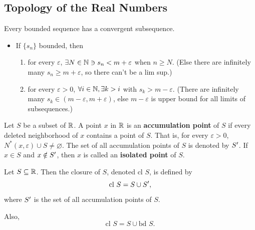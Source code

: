 \documentclass[12pt]{article}
\begin{document}
\subsection{Topology of the Real Numbers}
\label{sec:org67b264d}
Every bounded sequence has a convergent subsequence.
\begin{itemize}
\item If \(\{s_n\}\) bounded, then
\begin{enumerate}
\item for every \(\varepsilon\), \(\exists N \in \mathbb{N} \ni s_n < m + \varepsilon\) when \(n \ge N\). (Else there
are infinitely  many \(s_n \ge  m + \varepsilon\), so  there can't be  a lim
sup.)
\item for every \(\varepsilon > 0\), \(\forall i \in \mathbb{N}, \exists k>i\) with \(s_k > m - \varepsilon\).
(There are infinitely many  \(s_k \in (m-\varepsilon, m+\varepsilon)\), else
\(m-\varepsilon\) is upper bound for all limits of subsequences.)
\end{enumerate}
\end{itemize}

\begin{definition}
  Let $S$ be a subset of $\mathbb{R}$. A point $x$ in $\mathbb{R}$ is an
  \textbf{accumulation point} of $S$ if every deleted neighborhood of $x$
  contains a point of $S$. That is, for every $\varepsilon > 0$, $N^{*}(x,\varepsilon) \cup S \ne
  \varnothing$. The set of all accumulation points of $S$ is denoted by
  $S'$. If $x\in S$ and $x\notin S'$, then $x$ is called an \textbf{isolated
  point} of $S$.
\end{definition}

\begin{definition}[Closure]
  Let $S \subseteq \mathbb{R}$. Then the closure of $S$, denoted $\text{cl } S$, is
  defined by $$\text{cl } S = S \cup S',$$ where $S'$ is the set of all
  accumulation points of $S$.

  Also, $$\text{cl } S = S \cup \text{bd } S.$$
\end{definition}
\end{document}
